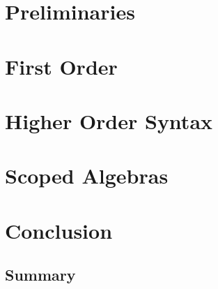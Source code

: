 \documentclass[10pt,a4paper,twoside]{report}
\begin{document}
\chapter{Preliminaries}
\label{chapter:preliminaries}


\chapter{First Order}
\label{chapter:first-order}


\chapter{Higher Order Syntax}
\label{chapter:higher-order}


\chapter{Scoped Algebras}
\label{chapter:scoped-algebras}


\chapter{Conclusion}
\label{chapter:conclusion}

\section{Summary}
\end{document}
